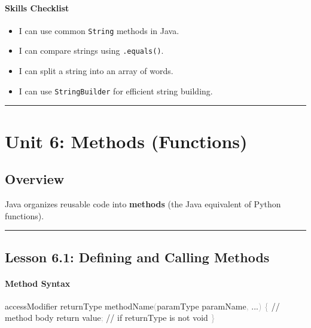 \documentclass[
  justified,
  openright,
]{tufte-book}
\let\subsubsection\paragraph
\let\paragraph\paragraph
\newcommand{\CommentTok}[1]{\textcolor{MidGray}{#1}}
\newcommand{\ControlFlowTok}[1]{\textcolor{BrandBlue}{#1}}
\newcommand{\FunctionTok}[1]{\textcolor{BrandBlue}{#1}}
\newcommand{\KeywordTok}[1]{\textcolor{BrandBlue}{#1}}
\newcommand{\NormalTok}[1]{#1}
\newcommand{\OperatorTok}[1]{\textcolor{DarkGray}{#1}}
\newenvironment{Shaded}{%
  \begin{snugshade}
}{%
  \end{snugshade}
}
\let\subsubsection\paragraph
\let\paragraph\paragraph
\providecommand{\tightlist}{%
  \setlength{\itemsep}{0pt}\setlength{\parskip}{0pt}}
\begin{document}
\subsubsection{Skills Checklist}\label{skills-checklist-13}

\begin{itemize}
\tightlist
\item[$\square$]
  I can use common \texttt{String} methods in Java.
\item[$\square$]
  I can compare strings using \texttt{.equals()}.
\item[$\square$]
  I can split a string into an array of words.
\item[$\square$]
  I can use \texttt{StringBuilder} for efficient string building.
\end{itemize}

\begin{center}\rule{0.5\linewidth}{0.5pt}\end{center}

\section{Unit 6: Methods (Functions)}\label{unit-6-methods-functions}

\subsection{Overview}\label{overview-6}

Java organizes reusable code into \textbf{methods} (the Java equivalent
of Python functions).

\begin{center}\rule{0.5\linewidth}{0.5pt}\end{center}

\subsection{Lesson 6.1: Defining and Calling
Methods}\label{lesson-6.1-defining-and-calling-methods}

\subsubsection{Method Syntax}\label{method-syntax}

\begin{Shaded}
\begin{Highlighting}[]
\NormalTok{accessModifier returnType }\FunctionTok{methodName}\OperatorTok{(}\NormalTok{paramType paramName}\OperatorTok{,} \KeywordTok{...}\OperatorTok{)} \OperatorTok{\{}
    \CommentTok{// method body}
    \ControlFlowTok{return}\NormalTok{ value}\OperatorTok{;}  \CommentTok{// if returnType is not void}
\OperatorTok{\}}
\end{Highlighting}
\end{Shaded}
\end{document}
